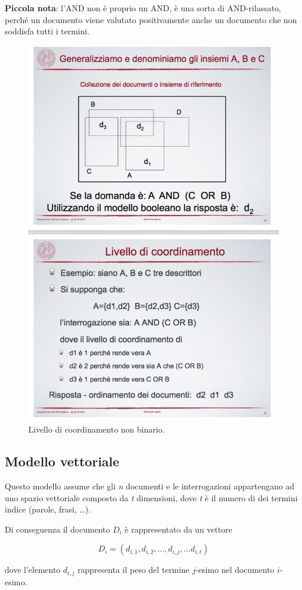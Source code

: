\textbf{Piccola nota}: l'AND non è proprio un AND, è una sorta di AND-rilassato, perché un documento viene valutato positivamente anche un documento che non soddisfa tutti i termini.

\begin{figure}[htbp]
	\centering
	\includegraphics[width=0.7\linewidth]{images/l8-cord-gen}
	\caption{Livello di coordinamento non binario.}
\end{figure}

\subsection{Modello vettoriale}

Questo modello assume che gli \textit{n} documenti e le interrogazioni appartengano ad uno spazio vettoriale composto da \textit{t} dimensioni, dove \textit{t} è il numero di dei termini indice (parole, frasi, \ldots).

Di conseguenza il documento $D_i$ è rappresentato da un vettore

$$
D_i = (d_{i,1},d_{i,2},\ldots,d_{i,j}, \ldots d_{i,t})
$$

\noindent dove l'elemento $d_{i,j}$ rappresenta il peso del termine $j$-esimo nel documento $i$-esimo.


